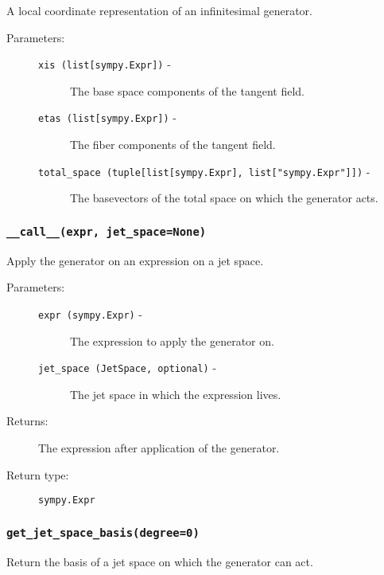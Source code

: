    A local coordinate representation of an infinitesimal generator.

   \begin{description}
      \item[Parameters:] \leavevmode
        \begin{description}
            \item[\lstinline{xis (list[sympy.Expr])} -] The base space components of the tangent field.
            \item[\lstinline{etas (list[sympy.Expr])} -] The fiber components of the tangent field.
            \item[\lstinline{total_space (tuple[list[sympy.Expr], list["sympy.Expr"]])} -] The base\newline vectors of the total space on which the generator acts.
        \end{description}
   \end{description}

   \subsubsection*{\lstinline{__call__(expr, jet_space=None)}}

      Apply the generator on an expression on a jet space.

      \begin{description}
         \item[Parameters:] \leavevmode
           \begin{description}
               \item[\lstinline{expr (sympy.Expr)} -] The expression to apply the generator on.
               \item[\lstinline{jet_space (JetSpace, optional)} -] The jet space in which the expression lives.
           \end{description}
         \item[Returns:] The expression after application of the generator.
         \item[Return type:] \lstinline{sympy.Expr}
      \end{description}
   
   \subsubsection*{\lstinline{get_jet_space_basis(degree=0)}}

      Return the basis of a jet space on which the generator can act.

